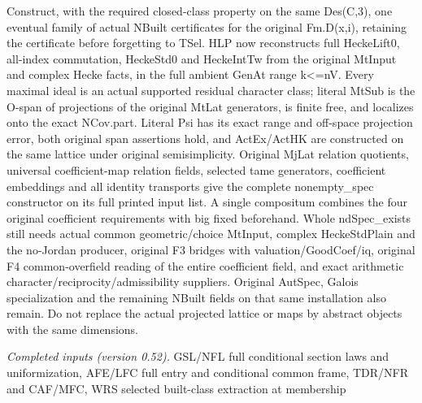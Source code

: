 Construct, with the required closed-class property on the same Des(C,3), one eventual family of actual NBuilt certificates for the original Fm.D(x,i), retaining the certificate before forgetting to TSel. HLP now reconstructs full HeckeLift0, all-index commutation, HeckeStd0 and HeckeIntTw from the original MtInput and complex Hecke facts, in the full ambient GenAt range k<=nV. Every maximal ideal is an actual supported residual character class; literal MtSub is the O-span of projections of the original MtLat generators, is finite free, and localizes onto the exact NCov.part. Literal Psi has its exact range and off-space projection error, both original span assertions hold, and ActEx/ActHK are constructed on the same lattice under original semisimplicity. Original MjLat relation quotients, universal coefficient-map relation fields, selected tame generators, coefficient embeddings and all identity transports give the complete nonempty\_\allowbreak spec constructor on its full printed input list. A single compositum combines the four original coefficient requirements with big fixed beforehand. Whole ndSpec\_\allowbreak exists still needs actual common geometric/choice MtInput, complex HeckeStdPlain and the no-Jordan producer, original F3 bridges with valuation/GoodCoef/iq, original F4 common-overfield reading of the entire coefficient field, and exact arithmetic character/reciprocity/admissibility suppliers. Original AutSpec, Galois specialization and the remaining NBuilt fields on that same installation also remain. Do not replace the actual projected lattice or maps by abstract objects with the same dimensions.

\emph{Completed inputs (version 0.52).} GSL/NFL full conditional section laws and uniformization, AFE/LFC full entry and conditional common frame, TDR/NFR and CAF/MFC, WRS selected built-class extraction at membership

